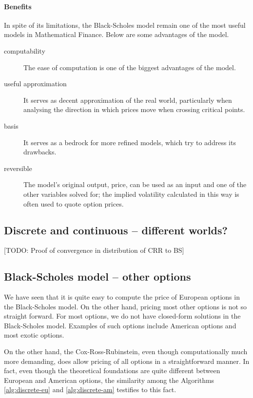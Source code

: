 \paragraph{Benefits}
In spite of its limitations, the Black-Scholes model remain one of the most useful models in Mathematical Finance. Below are some advantages of the model.
\begin{description}
	\item[computability] The ease of computation is one of the biggest advantages of the model.
	\item[useful approximation] It serves as decent approximation of the real world, particularly when analysing the direction in which prices move when crossing critical points.
	\item[basis] It serves as a bedrock for more refined models, which try to address its drawbacks.
	\item[reversible] The model's original output, price, can be used as an input and one of the other variables solved for; the implied volatility calculated in this way is often used to quote option prices.
\end{description}



\subsection{Discrete and continuous -- different worlds?}
[TODO: Proof of convergence in distribution of CRR to BS]



\subsection{Black-Scholes model -- other options}
\label{subsec:continuous-other}

We have seen that it is quite easy to compute the price of European options in the Black-Scholes model. On the other hand, pricing most other options is not so straight forward. For most options, we do not have closed-form solutions in the Black-Scholes model. Examples of such options include American options and most exotic options.

On the other hand, the Cox-Ross-Rubinstein, even though computationally much more demanding, does allow pricing of all options in a straightforward manner. In fact, even though the theoretical foundations are quite different between European and American options, the similarity among the Algorithms \ref{alg:discrete-eu} and \ref{alg:discrete-am} testifies to this fact.

